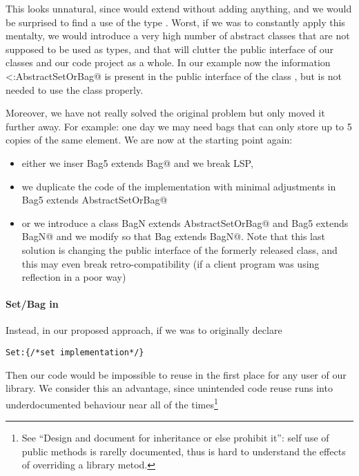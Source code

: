 This looks unnatural, since \Q@Set@ would extend \Q@AbstractSetOrBag@ without adding anything,
and we would be surprised to find a use of the type \Q@AbstractSetOrBag@.
Worst, if we was to constantly apply this mentalty, we would introduce a very high number
of abstract classes that are not supposed to be used as types, and that will clutter the 
public interface of our classes and our code project as a whole.
In our example now the information \Q@Set<:AbstractSetOrBag@ is present in the public interface
of the class \Q@Set@, but is not needed to use the class properly.

Moreover, we have not really solved the original problem but only moved it further away. For example: one day  we may need bags that can only store up to 5 copies of the same element.
We are now at the starting point again:
\begin{itemize}
\item either we inser \Q@class Bag5 extends Bag@ and we break LSP,
\item we duplicate the code of the \Q@Bag@ implementation with minimal adjustments in \Q@class Bag5 extends AbstractSetOrBag@
\item or we introduce a
\Q@abstract class BagN extends AbstractSetOrBag@ and \Q@class Bag5 extends BagN@
and we modify \Q@Bag@ so that  \Q@class Bag extends BagN@.
Note that this last solution is changing the public interface of the formerly released \Q@Bag@ class, and
this may even break retro-compatibility (if a client program was using reflection in a poor way)
\end{itemize}

\paragraph{Set/Bag in \name}
Instead, in our proposed approach, if we was to originally declare
\begin{lstlisting}
Set:{/*set implementation*/} 
\end{lstlisting}
Then our code would be impossible to reuse in the first place for any user of our library.
We consider this an advantage, since unintended code reuse runs into underdocumented behaviour near all of the times\footnote{See
``Design and document for inheritance or else prohibit it''\cite{https://www.infoq.com/articles/API-Design-Joshua-Bloch}:
self use of public methods is rarelly documented, thus is hard to understand the effects of overriding a library metod\cite{https://www.infoq.com/articles/API-Design-Joshua-Bloch}.
}

